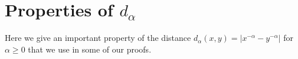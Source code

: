 \documentclass[11pt,a4paper]{article}
\newcommand{\RR}{\mathbb{R}}
\newcommand{\RRP}{\mathbb{R}^+_*}
\newtheorem{lemma}[theorem]{Lemma}
\begin{document}

\section{Properties of $d_\alpha$}
Here we give an important property of the distance $d_\alpha(x,y) = |x^{-\alpha} - y^{-\alpha}|$ for $\alpha \geq 0$ that we use in some of our proofs.
    
\end{document}
